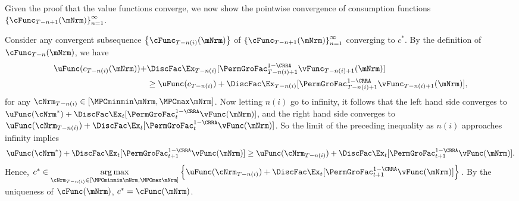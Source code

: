\documentclass[\econtexRoot/BufferStockTheory]{subfiles}
\begin{document}
Given the proof that the value functions converge, we now show the
pointwise convergence of consumption functions
$\left\{\cFunc_{T-n+1}(\mNrm)\right\} _{n=1}^{\infty }$.

Consider any convergent subsequence $\left\{\cFunc_{T-n(i)}(\mNrm)\right\}$ of $\left\{\cFunc_{T-n+1}(\mNrm)\right\} _{n=1}^{\infty }$ converging to $c^*$.
By the definition of $\cFunc_{T-n}(\mNrm)$, we have
\begin{equation}\begin{gathered}\begin{aligned}
  \begin{aligned}
    \uFunc(c_{T - n(i)}(\mNrm)) + & \DiscFac \Ex_{T - n(i)}[{\PermGroFac}_{T-n(i)+1}^{1 - \CRRA}\vFunc_{T-n(i)+1}(\mNrm)]  \\ & \geq  \uFunc(c_{T - n(i)}) + \DiscFac \Ex_{T - n(i)}[{\PermGroFac}_{T-n(i)+1}^{1 - \CRRA}\vFunc_{T-n(i)+1}(\mNrm)], 
    \end{aligned}
\end{aligned}\end{gathered}\end{equation}
for any $\cNrm_{T - n(i)} \in [\MPCminmin \mNrm,\MPCmax \mNrm]$.
Now letting $n(i)$ go to infinity, it follows that the left hand side converges to $\uFunc(\cNrm^*) + \DiscFac \Ex_{t}[{\PermGroFac}_{t}^{1 - \CRRA}\vFunc(\mNrm)]$, and the right hand side converges to $\uFunc(\cNrm_{T - n(i)}) + \DiscFac \Ex_{t}[{\PermGroFac}_{t}^{1 - \CRRA}\vFunc(\mNrm)]$.
So the limit of the preceding inequality as $n(i)$ approaches infinity implies 
\begin{equation}
   \uFunc(\cNrm^*) + \DiscFac \Ex_{t}[{\PermGroFac}_{t + 1}^{1 - \CRRA}\vFunc(\mNrm)] \geq \uFunc(\cNrm_{T - n(i)}) + \DiscFac \Ex_{t}[{\PermGroFac}_{t + 1}^{1 - \CRRA}\vFunc(\mNrm)].
\end{equation}
Hence, $c^* \in \underset{\cNrm_{T - n(i)} \in [\MPCminmin \mNrm,\MPCmax \mNrm]}{\arg \max }\left\{ \uFunc(\cNrm_{T - n(i)}) + \DiscFac \Ex_{t}[{\PermGroFac}_{t + 1}^{1 - \CRRA}\vFunc(\mNrm)]\right\}$.
By the uniqueness of $\cFunc(\mNrm)$, $c^* = \cFunc(\mNrm)$.
\end{document}
